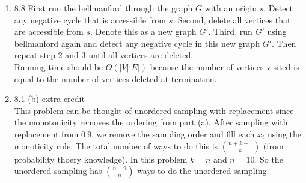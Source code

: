 \documentclass[11pt]{article}
\begin{document}
\begin{enumerate}
\item 8.8
First run the bellmanford through the graph $G$ with an origin $s$. Detect any negative cycle that is accessible from $s$. Second, delete all vertices that are accessible from $s$. Denote this as a new graph $G'$. Third, run $G'$ using bellmanford again and detect any negative cycle in this new graph $G'$. Then repeat step 2 and 3 until all vertices are deleted. \\
Running time should be $O(|V||E|)$ because the number of vertices visited is equal to the number of vertices deleted at termination.  



\pagebreak
\item 8.1 (b) extra credit\\
This problem can be thought of unordered sampling with replacement since the monotonicity removes the ordering from part (a). After sampling with replacement from $0~9$, we remove the sampling order and fill each $x_i$ using the monoticity rule. The total number of ways to do this is ${n+k-1 \choose k}$ (from probability thoery knowledge). In this problem $k=n$ and $n=10$. So the unordered sampling has ${n+9 \choose n}$ ways to do the unordered sampling.

\end{enumerate}
\end{document}
